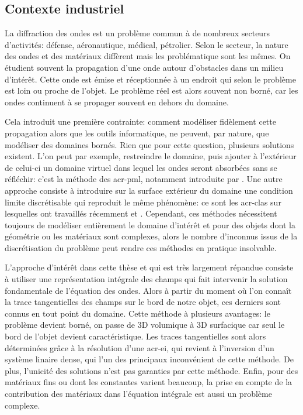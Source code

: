 \subsection*{Contexte industriel}
La diffraction des ondes est un problème commun à de nombreux secteurs d'activités: défense, aéronautique, médical, pétrolier. Selon le secteur, la nature des ondes et des matériaux diffèrent mais les problématique sont les mêmes. On étudient souvent la propagation d'une onde autour d'obstacles dans un milieu d’intérêt. Cette onde est émise et réceptionnée à un endroit qui selon le problème est loin ou proche de l'objet. Le problème réel est alors souvent non borné, car les ondes continuent à se propager souvent en dehors du domaine. 

Cela introduit une première contrainte: comment modéliser fidèlement cette propagation alors que les outils informatique, ne peuvent, par nature, que modéliser des domaines bornés. Rien que pour cette question, plusieurs solutions existent. L'on peut par exemple, restreindre le domaine, puis ajouter à l'extérieur de celui-ci un domaine virtuel dans lequel les ondes seront absorbées sans se réfléchir: c'est la méthode des \gls{acr-pml}, notamment introduite par \cite{berenger_perfectly_1994}. Une autre approche consiste à introduire sur la surface extérieur du domaine une condition limite discrétisable qui reproduit le même phénomène: ce sont les \glspl{acr-cla} sur lesquelles ont travaillés récemment \cite{barucq_etude_1993} et \cite{duprat_conditions_2011}. Cependant, ces méthodes nécessitent toujours de modéliser entièrement le domaine d’intérêt et pour des objets dont la géométrie ou les matériaux sont complexes, alors le nombre d'inconnus issus de la discrétisation du problème peut rendre ces méthodes en pratique insolvable.

L'approche d’intérêt dans cette thèse et qui est très largement répandue consiste à utiliser une représentation intégrale des champs qui fait intervenir la solution fondamentale de l'équation des ondes. Alors à partir du moment où l'on connaît la trace tangentielles des champs sur le bord de notre objet, ces derniers sont connus en tout point du domaine. Cette méthode à plusieurs avantages: le problème devient borné, on passe de 3D volumique à 3D surfacique car seul le bord de l'objet devient caractéristique. Les traces tangentielles sont alors déterminées grâce à la résolution d'une \gls{acr-ei}, qui revient à l'inversion d'un système linaire dense, qui l'un des principaux inconvénient de cette méthode. De plus, l'unicité des solutions n'est pas garanties par cette méthode. Enfin, pour des matériaux fins ou dont les constantes varient beaucoup, la prise en compte de la contribution des matériaux dans l'équation intégrale est aussi un problème complexe.

